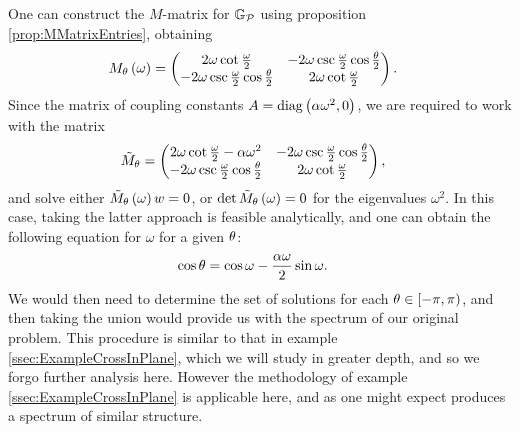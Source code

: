 One can construct the $M$-matrix for $\mathbb{G}_{\mathcal{P}}$ using proposition \ref{prop:MMatrixEntries}, obtaining
\begin{align*}
	M_{\theta}\left( \omega \right) &= 
	\begin{pmatrix} 
		2\omega\cot\frac{\omega}{2} & -2\omega\csc\frac{\omega}{2}\cos\frac{\theta}{2} \\
		-2\omega\csc\frac{\omega}{2}\cos\frac{\theta}{2} & 2\omega\cot\frac{\omega}{2}
	\end{pmatrix}.
\end{align*}
Since the matrix of coupling constants $A = \mathrm{diag}\left( \alpha\omega^2, 0 \right)$, we are required to work with the matrix
\begin{align*}
	\tilde{M}_\theta &= 
	\begin{pmatrix}
		2\omega\cot\frac{\omega}{2} - \alpha\omega^2 & -2\omega\csc\frac{\omega}{2}\cos\frac{\theta}{2} \\
		-2\omega\csc\frac{\omega}{2}\cos\frac{\theta}{2} & 2\omega\cot\frac{\omega}{2}		
	\end{pmatrix},
\end{align*}
and solve either $\tilde{M}_\theta\left( \omega \right) w = 0$, or $\det\tilde{M}_\theta \left( \omega \right) = 0$ for the eigenvalues $\omega^2$.
In this case, taking the latter approach is feasible analytically, and one can obtain the following equation for $\omega$ for a given $\theta$:
\begin{align*}
	\cos\theta &= \cos\omega - \frac{\alpha\omega}{2}\sin\omega.
\end{align*}
We would then need to determine the set of solutions for each $\theta\in\left[-\pi, \pi\right)$, and then taking the union would provide us with the spectrum of our original problem.
This procedure is similar to that in example \ref{ssec:ExampleCrossInPlane}, which we will study in greater depth, and so we forgo further analysis here.
However the methodology of example \ref{ssec:ExampleCrossInPlane} is applicable here, and as one might expect produces a spectrum of similar structure.

